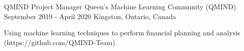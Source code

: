 

\begin{cventries}

  \cventry
    {QMIND Project Manager} %
    {Queen's Machine Learning Community (QMIND)} %
    {September 2019 - April 2020} %
    {Kingston, Ontario, Canada} %
    {
      \begin{cvitems} %
        \item {Using machine learning techniques to perform financial planning and analysis
(https://github.com/QMIND-Team)}
      \end{cvitems}
    }

\end{cventries}
